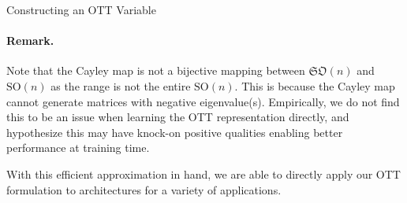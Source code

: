 \begin{algorithm}
	\caption{ \label{alg:ott-core} Constructing an OTT Variable}
	\SetAlgoLined
	\DontPrintSemicolon
\end{algorithm}

\paragraph{Remark.} Note that the Cayley map is not a bijective mapping between $\mathfrak{SO}(n)$ and $\text{SO}(n)$ as the range is not the entire $\text{SO}(n)$. This is because the Cayley map cannot generate matrices with negative eigenvalue(s). Empirically, we do not find this to be an issue when learning the OTT representation directly, and hypothesize this may have knock-on positive qualities enabling better performance at training time.

With this efficient approximation in hand, we are able to directly apply our OTT formulation to architectures for a variety of applications.